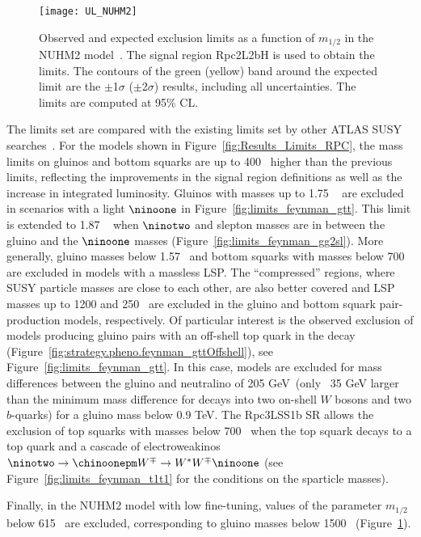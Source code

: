 \begin{figure}[b]
\centering
\texttt{[image: UL\_NUHM2]}\label{fig:limits_feynman_nuhm2}
\caption{Observed and expected exclusion limits as a function of $m_{1/2}$ in the NUHM2 model~\cite{Ellis:2002iu,Ellis:2002wv}.
The signal region Rpc2L2bH is used to obtain the limits. 
The contours of the green (yellow) band around the expected limit are the $\pm$1$\sigma$ ($\pm$2$\sigma$) results, including all uncertainties. The limits are computed at 95\% CL.}
\label{fig:Results_Limits_NUHM2} 
\end{figure} 

The limits set are compared with the existing limits set by other ATLAS SUSY 
searches~\cite{paperSS3L,Aad:2016jxj}. For the models shown in Figure~\ref{fig:Results_Limits_RPC}, 
the mass limits on gluinos and bottom squarks are up to 400 \GeV~higher than the previous limits, reflecting the improvements 
in the signal region definitions as well as the increase in integrated luminosity. Gluinos with masses up to 1.75 \TeV~
are excluded in scenarios with a light $\ninoone$ in Figure~\ref{fig:limits_feynman_gtt}. This limit is extended to 1.87 \TeV~ when 
$\ninotwo$ and slepton masses are in between the gluino and the $\ninoone$ masses (Figure~\ref{fig:limits_feynman_gg2sl}). More generally, gluino masses 
below 1.57 \TeV~and bottom squarks with masses below 700 \GeV
are excluded in models with a massless LSP. The ``compressed'' regions, where SUSY particle masses are close to each other, are also better covered 
and LSP masses up to 1200 and 250 \GeV~are excluded in the gluino and bottom squark pair-production models, respectively. Of particular
interest is the observed exclusion of models producing gluino pairs with an off-shell top quark in the decay (Figure~\ref{fig:strategy.pheno.feynman_gttOffshell}), 
see Figure~\ref{fig:limits_feynman_gtt}. In this case, models are excluded for mass differences between the gluino and neutralino of 205 GeV~(only ~35 GeV
larger than the minimum mass difference for decays into two on-shell $W$ bosons and two $b$-quarks) for a gluino mass below 0.9
TeV. The Rpc3LSS1b SR allows the exclusion of top squarks with masses below 700 \GeV~when the top squark decays to a top quark and a cascade of electroweakinos 
$\ninotwo \to \chinoonepm W^{\mp} \to W^{*} W^{\mp} \ninoone$ (see Figure~\ref{fig:limits_feynman_t1t1} for the conditions 
on the sparticle masses).


Finally, in the NUHM2 model with low fine-tuning, values of the parameter $m_{1/2}$ below 615 \GeV~are excluded, 
corresponding to gluino masses below 1500 \GeV~(Figure~\ref{fig:Results_Limits_NUHM2}).
